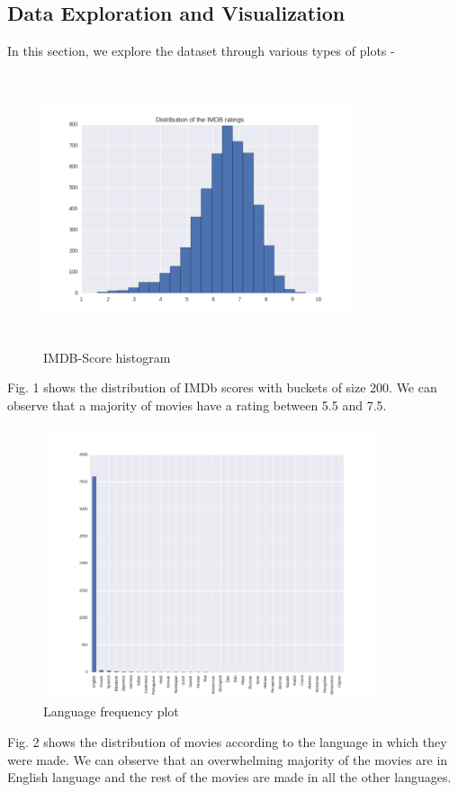 \documentclass[conference]{IEEEtran}
\begin{document}
\subsection{Data Exploration and Visualization}
In this section, we explore the dataset through various types of plots -
\begin{figure}[H]
  \centering	
  \captionsetup{justification=centering}
  \includegraphics[height=8cm, width=9cm, trim={20mm 0mm 10mm 0mm},clip]{../visualizations/IMDB-Score-Histogram}
  \caption{IMDB-Score histogram}
  \label{fig:fig1}
\end{figure}
Fig. 1 shows the distribution of IMDb scores with buckets of size 200. We can observe that a majority of movies have a rating between 5.5 and 7.5.

\begin{figure}[H]
  \centering	
  \captionsetup{justification=centering}
  \includegraphics[height=8cm, width=10cm, trim={20mm 0mm 10mm 20mm},clip]{../visualizations/Language-Histogram}
  \caption{Language frequency plot}
  \label{fig:fig2}
\end{figure}
Fig. 2 shows the distribution of movies according to the language in which they were made. We can observe that an overwhelming majority of the movies are in English language and the rest of the movies are made in all the other languages.
\end{document}
